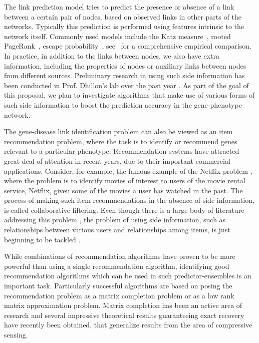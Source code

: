 The link prediction model tries to predict the presence or absence of a link between a certain pair of nodes, based on observed links in other parts of the networks. Typically this prediction is performed using features intrinsic to the network itself. Commonly used models include the Katz measure~\cite{Katz}, rooted PageRank~\cite{KleinbergLinkPred}, escape probability~\cite{1281272}, see~\cite{KleinbergLinkPred} for a comprehensive empirical comparison. In practice, in addition to the links between nodes, we also have extra information, including the properties of nodes or auxiliary links between nodes from different sources. Preliminary research in using such side information has been conducted in Prof. Dhillon's lab over the past year \cite{vasukiNatarajan, berkantSupervised}. As part of the goal of this proposal, we plan to investigate algorithms that make use of various forms of such side information to boost the prediction accuracy in the gene-phenotype network.

The gene-disease link identification problem can also be viewed as an item recommendation problem, where the task is to identify or recommend genes relevant to a particular phenotype. Recommendation systems\cite{ResnickRecommender,BurkeRecommender,SandvigRecommender,DemirizRecommender,GunawardanaRecommender,TikkRecommender,DBLP:conf/recsys/ViappianiB09,DBLP:conf/recsys/ParkT08,itemRecommendation} have attracted great deal of attention in recent years, due to their important commercial applications. Consider, for example, the famous example of the Netflix problem \cite{yehudaMillionDollar}, where the problem is to identify movies of interest to users of the movie rental service, Netflix, given some of the movies a user has watched in the past. The process of making such item-recommendations in the absence of side information, is called collaborative filtering. Even though there is a large body of literature addressing this problem \cite{yehudaMillionDollar, GoogleCFLatent, BillsusCollaborative,GeorgeCollaborative,LindenCollaborative,SarwarCollaborative,oneClassCollaborative}, the problem of using side information, such as relationships between various users and relationships among items, is just beginning to be tackled \cite{GoogleCCF}.

While combinations of recommendation algorithms have proven to be more powerful than using a single recommendation algorithm, identifying good recommendation algorithms which can be used in such predictor-ensembles is an important task. Particularly successful algorithms are based on posing the recommendation problem as a matrix completion problem or as a low rank matrix approximation problem. Matrix completion has been an active area of research and several impressive theoretical results guaranteeing exact recovery have recently been obtained, that generalize results from the area of compressive sensing\cite{DBLP:journals/tit/CandesT05,candesRPCA09,candesRecht08,Tsaig06compressedsensing, PrateekSVP, Baraniuk07compressivesensing, mekaMatrixCompletion,KeshavanMatrixCompletion,RechtMatrixCompletion}.